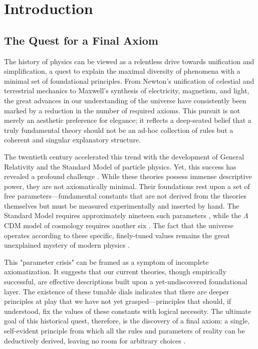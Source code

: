 \documentclass[axioms,article,submit,pdftex,oneauthor]{Definitions/mdpi}
\begin{document}
\section{Introduction}

\subsection{The Quest for a Final Axiom}
The history of physics can be viewed as a relentless drive towards unification and simplification, a quest to explain the maximal diversity of phenomena with a minimal set of foundational principles. From Newton's unification of celestial and terrestrial mechanics to Maxwell's synthesis of electricity, magnetism, and light, the great advances in our understanding of the universe have consistently been marked by a reduction in the number of required axioms. This pursuit is not merely an aesthetic preference for elegance; it reflects a deep-seated belief that a truly fundamental theory should not be an ad-hoc collection of rules but a coherent and singular explanatory structure.

The twentieth century accelerated this trend with the development of General Relativity and the Standard Model of particle physics. Yet, this success has revealed a profound challenge \cite{smolin2006trouble}. While these theories possess immense descriptive power, they are not axiomatically minimal. Their foundations rest upon a set of free parameters—fundamental constants that are not derived from the theories themselves but must be measured experimentally and inserted by hand. The Standard Model requires approximately nineteen such parameters \cite{Zyla2022}, while the \(\Lambda\)CDM model of cosmology requires another six \cite{Planck2018}. The fact that the universe operates according to these specific, finely-tuned values remains the great unexplained mystery of modern physics \cite{wigner1960unreasonable}.

This "parameter crisis" can be framed as a symptom of incomplete axiomatization. It suggests that our current theories, though empirically successful, are effective descriptions built upon a yet-undiscovered foundational layer. The existence of these tunable dials indicates that there are deeper principles at play that we have not yet grasped—principles that should, if understood, fix the values of these constants with logical necessity. The ultimate goal of this historical quest, therefore, is the discovery of a final axiom: a single, self-evident principle from which all the rules and parameters of reality can be deductively derived, leaving no room for arbitrary choices \cite{weinberg1993dreams}.
\end{document}
